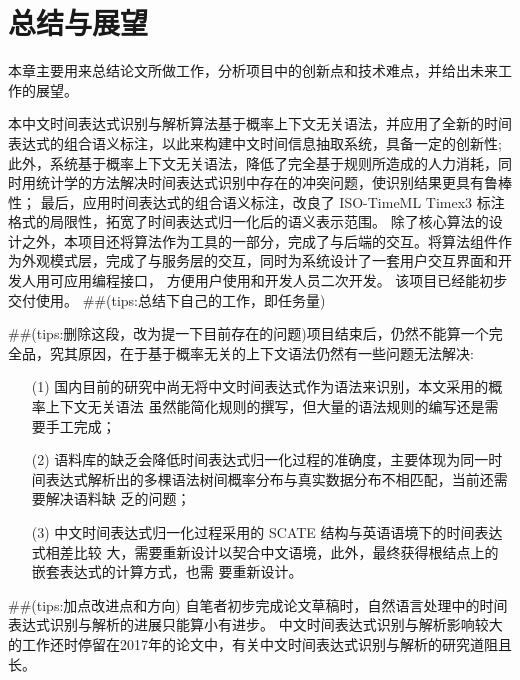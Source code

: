 
\chapter{总结与展望}

本章主要用来总结论文所做工作，分析项目中的创新点和技术难点，并给出未来工作的展望。

本中文时间表达式识别与解析算法基于概率上下文无关语法，并应用了全新的时间表达式的组合语义标注，以此来构建中文时间信息抽取系统，具备一定的创新性;
此外，系统基于概率上下文无关语法，降低了完全基于规则所造成的人力消耗，同时用统计学的方法解决时间表达式识别中存在的冲突问题，使识别结果更具有鲁棒性；
最后，应用时间表达式的组合语义标注，改良了 ISO-TimeML Timex3 标注格式的局限性，拓宽了时间表达式归一化后的语义表示范围。
除了核心算法的设计之外，本项目还将算法作为工具的一部分，完成了与后端的交互。将算法组件作为外观模式层，完成了与服务层的交互，同时为系统设计了一套用户交互界面和开发人用可应用编程接口，
方便用户使用和开发人员二次开发。 该项目已经能初步交付使用。
##(tips:总结下自己的工作，即任务量)

##(tips:删除这段，改为提一下目前存在的问题)项目结束后，仍然不能算一个完全品，究其原因，在于基于概率无关的上下文语法仍然有一些问题无法解决:
\begin{enumerate}
    \item[(1)] 国内目前的研究中尚无将中文时间表达式作为语法来识别，本文采用的概率上下文无关语法
    虽然能简化规则的撰写，但大量的语法规则的编写还是需要手工完成；
    \item[(2)] 语料库的缺乏会降低时间表达式归一化过程的准确度，主要体现为同一时
    间表达式解析出的多棵语法树间概率分布与真实数据分布不相匹配，当前还需要解决语料缺
    乏的问题；
    \item[(3)] 中文时间表达式归一化过程采用的 SCATE 结构与英语语境下的时间表达式相差比较
    大，需要重新设计以契合中文语境，此外，最终获得根结点上的嵌套表达式的计算方式，也需
    要重新设计。
\end{enumerate}

##(tips:加点改进点和方向)
自笔者初步完成论文草稿时，自然语言处理中的时间表达式识别与解析的进展只能算小有进步。 
中文时间表达式识别与解析影响较大的工作还时停留在2017年的论文中，有关中文时间表达式识别与解析的研究道阻且长。



